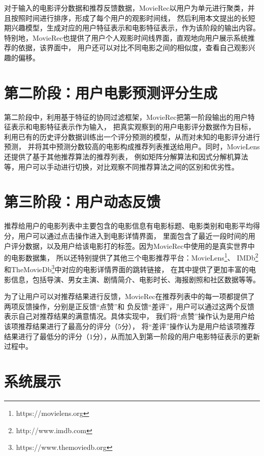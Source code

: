 对于输入的电影评分数据和推荐反馈数据，MovieRec以用户为单元进行聚类，并且按照时间进行排序，形成了每个用户的观影时间线，
然后利用本文提出的长短期兴趣模型，生成对应的用户特征表示和电影特征表示，作为该阶段的输出内容。
特别地，MovieRec也提供了用户个人观影时间线界面，直观地向用户展示系统推荐的依据，该界面中，
用户还可以对比不同电影之间的相似度，查看自己观影兴趣的偏移。

\section{第二阶段：用户电影预测评分生成}
第二阶段中，利用基于特征的协同过滤框架，MovieRec把第一阶段输出的用户特征表示和电影特征表示作为输入，
把真实观察到的用户电影评分数据作为目标，利用已有的历史评分数据训练出一个评分预测的模型，从而对未知的电影评分进行预测，
并将其中预测分数较高的电影构成推荐列表推送给用户。同时，MovieLens还提供了基于其他推荐算法的推荐列表，
例如矩阵分解算法和因式分解机算法等，用户可以手动进行切换，对比观察不同推荐算法之间的区别和优劣性。

\section{第三阶段：用户动态反馈}
推荐给用户的电影列表中主要包含的电影信息有电影标题、电影类别和电影平均得分，用户可以通过点击操作进入到电影详情界面，
里面包含了最近一段时间的用户评分数据，以及用户给该电影打的标签。因为MovieRec中使用的是真实世界中的电影数据集，
所以还特别提供了其他三个电影推荐平台：MovieLens\footnote{https://movielens.org}、
IMDb\footnote{http://www.imdb.com}和TheMovieDb\footnote{https://www.themoviedb.org}中对应的电影详情界面的跳转链接，
在其中提供了更加丰富的电影信息，包括导演、男女主演、剧情简介、电影时长、海报剧照和社区数据等等。

为了让用户可以对推荐结果进行反馈，MovieRec在推荐列表中的每一项都提供了两项反馈操作，分别是正反馈``点赞''和
负反馈``差评''，用户可以通过这两个反馈表示自己对推荐结果的满意情况。具体实现中，
我们将``点赞''操作认为是用户给该项推荐结果进行了最高分的评分（$5$分），
将``差评''操作认为是用户给该项推荐结果进行了最低分的评分（$1$分），从而加入到第一阶段的用户电影特征表示的更新过程中。

\section{系统展示}

